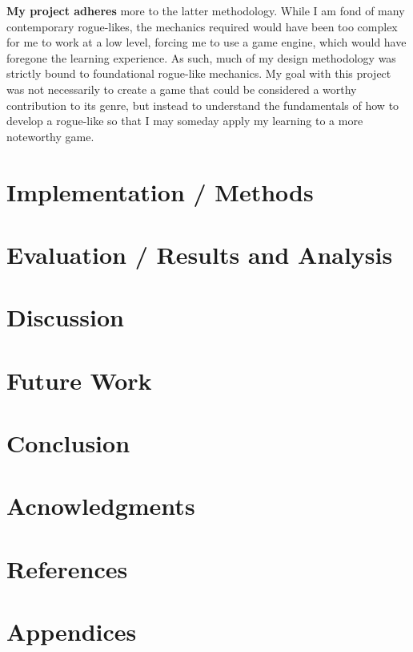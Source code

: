 \documentclass[sigconf,nonacm]{acmart}
\begin{document}
\textbf {My project adheres} more to the latter methodology. While I am fond of many contemporary rogue-likes, the mechanics required would have been too complex for me to work at a low level, forcing me to use a game engine, which would have foregone the learning experience. As such, much of my design methodology was strictly bound to foundational rogue-like mechanics. My goal with this project was not necessarily to create a game that could be considered a worthy contribution to its genre, but instead to understand the fundamentals of how to develop a rogue-like so that I may someday apply my learning to a more noteworthy game. 

\pagebreak


\section{Implementation / Methods}

\section{Evaluation / Results and Analysis}

\section{Discussion}

\section{Future Work}

\section{Conclusion}

\section{Acnowledgments}

\section{References}

\section{Appendices}
\end{document}
